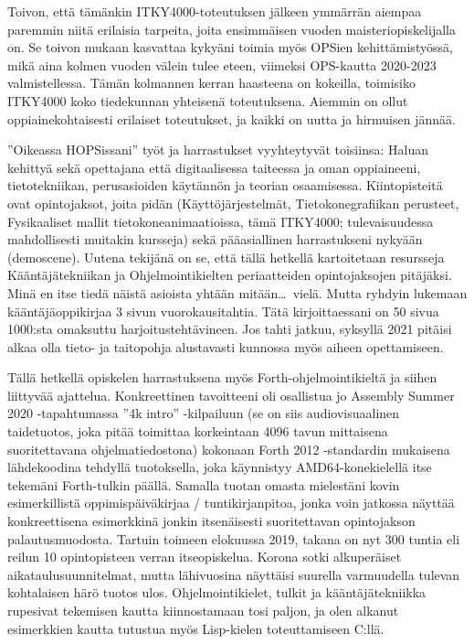 \documentclass[utf8]{gradu3}
\begin{document}
Toivon, että tämänkin ITKY4000-toteutuksen jälkeen ymmärrän aiempaa paremmin
niitä erilaisia tarpeita, joita ensimmäisen vuoden maisteriopiskelijalla on. Se
toivon mukaan kasvattaa kykyäni toimia myös OPSien kehittämistyössä, mikä aina
kolmen vuoden välein tulee eteen, viimeksi OPS-kautta 2020-2023 valmistellessa.
Tämän kolmannen kerran haasteena on kokeilla, toimisiko ITKY4000 koko
tiedekunnan yhteisenä toteutuksena. Aiemmin on ollut oppiainekohtaisesti
erilaiset toteutukset, ja kaikki on uutta ja hirmuisen jännää.

''Oikeassa HOPSissani'' työt ja harrastukset vyyhteytyvät toisiinsa: Haluan
kehittyä sekä opettajana että digitaalisessa taiteessa ja oman oppiaineeni,
tietotekniikan, perusasioiden käytännön ja teorian osaamisessa. Kiintopisteitä
ovat opintojaksot, joita pidän (Käyttöjärjestelmät, Tietokonegrafiikan
perusteet, Fysikaaliset mallit tietokoneanimaatioissa, tämä ITKY4000;
tulevaisuudessa mahdollisesti muitakin kursseja) sekä pääasiallinen
harrastukseni nykyään (demoscene). Uutena tekijänä on se, että tällä hetkellä
kartoitetaan resursseja Kääntäjätekniikan ja Ohjelmointikielten periaatteiden
opintojaksojen pitäjäksi. Minä en itse tiedä näistä asioista yhtään
mitään\ldots\ vielä. Mutta ryhdyin lukemaan kääntäjäoppikirjaa 3 sivun
vuorokausitahtia. Tätä kirjoittaessani on 50 sivua 1000:sta omaksuttu
harjoitustehtävineen. Jos tahti jatkuu, syksyllä 2021 pitäisi alkaa olla tieto-
ja taitopohja alustavasti kunnossa myös aiheen opettamiseen.

Tällä hetkellä opiskelen harrastuksena myös Forth-ohjelmointikieltä ja siihen
liittyvää ajattelua. Konkreettinen tavoitteeni oli osallistua jo Assembly Summer
2020 -tapahtumassa ''4k intro'' -kilpailuun (se on siis audiovisuaalinen
taidetuotos, joka pitää toimittaa korkeintaan 4096 tavun mittaisena
suoritettavana ohjelmatiedostona) kokonaan Forth 2012 -standardin mukaisena
lähdekoodina tehdyllä tuotoksella, joka käynnistyy AMD64-konekielellä itse
tekemäni Forth-tulkin päällä. Samalla tuotan omasta mielestäni kovin
esimerkillistä oppimispäiväkirjaa / tuntikirjanpitoa, jonka voin jatkossa
näyttää konkreettisena esimerkkinä jonkin itsenäisesti suoritettavan
opintojakson palautusmuodosta. Tartuin toimeen elokuussa 2019, takana on nyt 300
tuntia eli reilun 10 opintopisteen verran itseopiskelua. Korona sotki
alkuperäiset aikataulusuunnitelmat, mutta lähivuosina näyttäisi suurella
varmuudella tulevan kohtalaisen härö tuotos ulos. Ohjelmointikielet, tulkit ja
kääntäjätekniikka rupesivat tekemisen kautta kiinnostamaan tosi paljon, ja olen
alkanut esimerkkien kautta tutustua myös Lisp-kielen toteuttamiseen C:llä.
\end{document}
